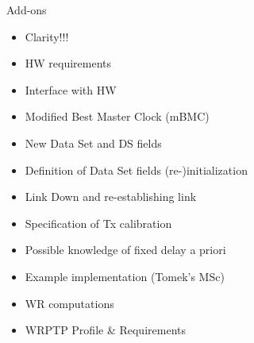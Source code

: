 \documentclass[compress,red]{beamer}
\begin{document}
\begin{frame}{Add-ons }


   \begin{itemize}
	\item Clarity!!!
	\item HW requirements
	\item Interface with HW
	\item Modified Best Master Clock (mBMC)
	\item New Data Set and DS fields
	\item Definition of Data Set fields (re-)initialization
	\item Link Down	and re-establishing link		
	\item Specification of Tx calibration
	\item Possible knowledge of fixed delay a priori					%
	\item Example implementation (Tomek's MSc)
	\item WR computations
	\item WRPTP Profile \& Requirements



   \end{itemize}

\end{frame}
\end{document}

